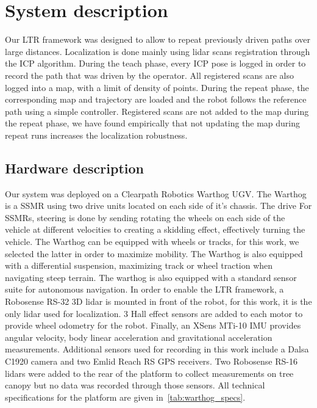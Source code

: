 \section{System description}
\label{sec:sys}

Our \ac{LTR} framework was designed to allow to repeat previously driven paths over large distances. 
Localization is done mainly using lidar scans registration through the \ac{ICP} algorithm.
During the teach phase, every \ac{ICP} pose is logged in order to record the path that was driven by the operator.
All registered scans are also logged into a map, with a limit of density of points. 
During the repeat phase, the corresponding map and trajectory are loaded and the robot follows the reference path using a simple controller.
Registered scans are not added to the map during the repeat phase, we have found empirically that not updating the map during repeat runs increases the localization robustness.


\subsection{Hardware description}
\label{sec:hardware}

Our system was deployed on a Clearpath Robotics Warthog \ac{UGV}. 
The Warthog is a \ac{SSMR} using two drive units located on each side of it's chassis. 
The drive
For \acp{SSMR}, steering is done by sending rotating the wheels on each side of the vehicle at different velocities to creating a skidding effect, effectively turning the vehicle.
The Warthog can be equipped with wheels or tracks, for this work, we selected the latter in order to maximize mobility. 
The Warthog is also equipped with a differential suspension, maximizing track or wheel traction when navigating steep terrain.
The warthog is also equipped with a standard sensor suite for autonomous navigation. 
In order to enable the \ac{LTR} framework, a Robosense RS-32 3D lidar is mounted in front of the robot, for this work, it is the only lidar used for localization.
3 Hall effect sensors are added to each motor to provide wheel odometry for the robot. 
Finally, an XSens MTi-10 \ac{IMU} provides angular velocity, body linear acceleration and gravitational acceleration measurements. 
Additional sensors used for recording in this work include a Dalsa C1920 camera and two Emlid Reach RS \ac{GPS} receivers.
Two Robosense RS-16 lidars were added to the rear of the platform to collect measurements on tree canopy but no data was recorded through those sensors. 
All technical specifications for the platform are given in~\autoref{tab:warthog_specs}.


